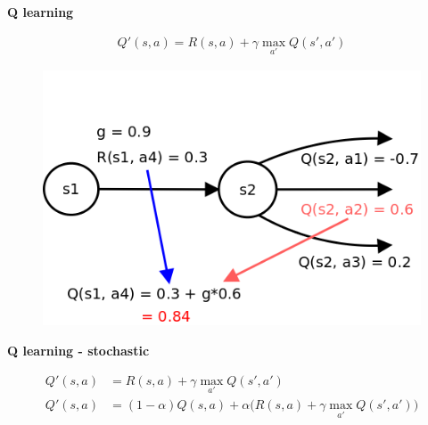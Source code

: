\documentclass[xcolor=dvipsnames]{beamer}
\begin{document}
\begin{frame}{\bf Q learning}

\begin{align*}
Q'(s, a) = R(s, a) + \gamma \max \limits_{a'} Q(s', a')
\end{align*}

\begin{figure}
  \includegraphics[scale=0.3]{../../diagrams/q_learning_detail.png}
\end{figure}

\end{frame}


\begin{frame}{\bf Q learning - stochastic}


\begin{align*}
Q'(s, a) &= R(s, a) + \gamma \max \limits_{a'} Q(s', a') \\
Q'(s, a) &= (1-\alpha)Q(s, a) + \alpha\Big(R(s, a) + \gamma \max \limits_{a'} Q(s', a')\Big)
\end{align*}


\end{frame}
\end{document}

